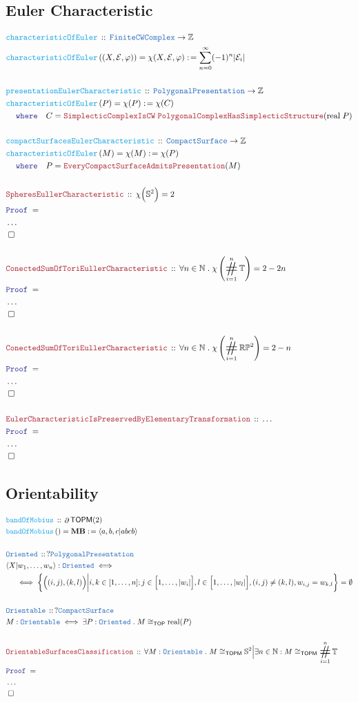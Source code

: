 \documentclass[12pt]{scrartcl}
\newcommand{\TYPE}[1]{\textcolor{NavyBlue}{\mathtt{#1}}}
\newcommand{\FUNC}[1]{\textcolor{Cerulean}{\mathtt{#1}}}
\newcommand{\LOGIC}[1]{\textcolor{Blue}{\mathtt{#1}}}
\newcommand{\THM}[1]{\textcolor{Maroon}{\mathtt{#1}}}
\renewcommand{\.}{\; . \;}
\newcommand{\de}{: \kern 0.1pc =}
\newcommand{\where}{\LOGIC{where}}
\newcommand{\Act}[1]{\left( #1 \right)}
\newcommand{\Theorem}[2]{& \THM{#1} \, :: \, #2 \\ & \Proof = \\ }
\newcommand{\DeclareType}[2]{& \TYPE{#1} \, :: \, #2 \\}
\newcommand{\DefineType}[3]{& #1 : \TYPE{#2} \iff #3 \\}
\newcommand{\DeclareFunc}[2]{& \FUNC{#1} \, :: \, #2 \\}
\newcommand{\DefineNamedFunc}[4]{&  \FUNC{#1}\Act{#2} = #3 \de #4 \\}
\newcommand{\NewLine}{\\ & \kern 1pc}
\newcommand{\Page}[1]{ \begin{align*} #1 \end{align*}   }
\newcommand{\NoProof}{ & \ldots \\ \EndProof}
\newcommand{\Int}{\mathbb{Z} }
\newcommand{\Reals}{\mathbb{R} }
\newcommand{\Sphere}{\mathbb{S}}
\newcommand{\Nat}{\mathbb{N} }
\newcommand{\QED}{\; \square}
\newcommand{\EndProof}{& \QED \\}
\newcommand{\Proof}{\LOGIC{Proof} \; }
\DeclareMathOperator*{\boundary}{\partial}
\newcommand{\TOP}{\mathsf{TOP}}
\renewcommand{\P}{\mathbb{P}}
\newcommand{\CS}{\TYPE{CompactSurface}}
\DeclareMathOperator{\bigsum}{\scalerel*{\#}{\sum}} %
\newcommand{\TOPM}{\mathsf{TOPM}}
\newcommand{\E}{\mathcal{E}}
\begin{document}
\subsection{Euler Characteristic}
\Page{
	\DeclareFunc{characteristicOfEuler}
	{
		\TYPE{FiniteCWComplex} \to \Int
	}
	\DefineNamedFunc{characteristicOfEuler}{(X,\E,\varphi)}{\chi(X,\E,\varphi)}
	{
		\sum^{\infty}_{n=0} (-1)^n|\E_i|
	}
	\\
	\DeclareFunc{presentationEulerCharacteristic}
	{
		\TYPE{PolygonalPresentation} \to \Int
	}
	\DefineNamedFunc{characteristicOfEuler}{ P} {\chi(P)}
	{
		\chi(C) \NewLine 
		\where  \quad	
		C = \THM{SimplecticComplexIsCW} \; \THM{PolygonalComplexHasSimplecticStructure}(\mathrm{real}\;P)
	}
	\\
	\DeclareFunc{compactSurfacesEulerCharacteristic}
	{
		\CS \to \Int
	}
	\DefineNamedFunc{characteristicOfEuler}{ M} {\chi(M)}
	{
		\chi(P) \NewLine 
		\where  \quad	
		P = \THM{EveryCompactSurfaceAdmitsPresentation}(M)
	}
	\\
	\Theorem{SpheresEullerCharacteristic}{\chi\Big( \Sphere^2 \Big) = 2}
	\NoProof
	\\
	\Theorem{ConectedSumOfToriEullerCharacteristic}
	{
		\forall n \in \Nat \.
		\chi\Act{\bigsum^n_{i=1} \mathbb{T}} = 2 - 2n  
	}
	\NoProof
	\\
	\Theorem{ConectedSumOfToriEullerCharacteristic}
	{
		\forall n \in \Nat \.
		\chi\Act{\bigsum^n_{i=1} \Reals \P^2} = 2 - n  
	}
	\NoProof
	\\
	\Theorem{EulerCharacteristicIsPreservedByElementaryTransformation}{\ldots}
	\NoProof
}
\newpage
\subsection{Orientability}
\Page{
	\DeclareFunc{bandOfMobius}{\boundary \TOPM(2)}
	\DefineNamedFunc{bandOfMobius}{}{\mathbf{MB}}
	{ \langle a,b,c |  abcb \rangle  }
	\\
	\DeclareType{Oriented}{? \TYPE{PolygonalPresentation}}
	\DefineType{\langle X | w_1,\ldots,w_n \rangle}{Oriented}
	{
		\NewLine
		\iff
		\bigg\{
			\Big( (i,j),(k,l)\Big) 
			\bigg|	
			i,k \in [1,\ldots,n] ;
			j \in \Big[1, \ldots, |w_i| \Big] ,
			l \in \Big[1, \ldots, |w_l| \Big] ,
			(i,j) \neq (k,l), w_{i,j} = w_{k,l}
		\bigg\} = \emptyset
	}
	\\
	\DeclareType{Orientable}{?\CS}
	\DefineType{M}{Orientable}
	{
		\exists  P : \TYPE{Oriented} \. 
		M \cong_\TOP \mathrm{real}(P)
	}
	\\
	\Theorem{OrientableSurfacesClassification}
	{
		\forall M : \TYPE{Orientable} \.
		M \cong_{\TOPM} \Sphere^2 
		\Big|
		\exists n \in \Nat : 
		M \cong_{\TOPM} \bigsum^n_{i=1} \mathbb{T}
	}
	\NoProof
}
\newpage
\end{document}
